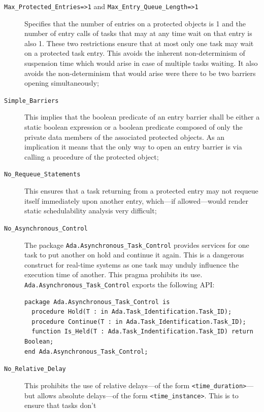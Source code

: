 \begin{description}
\item[\texttt{Max\_Protected\_Entries=>1} and
  \texttt{Max\_Entry\_Queue\_Length=>1}]{Specifies that the number of
  entries on a protected objects is 1 and the number of entry calls of
  tasks that may at any time wait on that entry is also 1. These two
  restrictions ensure that at most only one task may wait on a
  protected task entry. This avoids the inherent non-determinism of
  suspension time which would arise in case of multiple tasks
  waiting. It also avoids the non-determinism that would arise were
  there to be two barriers opening simultaneously;}
\item[\texttt{Simple\_Barriers}]{This implies that the boolean
  predicate of an entry barrier shall be either a static boolean
  expression or a boolean predicate composed of only the private data
  members of the associated protected objects. As an implication it
  means that the only way to open an entry barrier is via calling a
  procedure of the protected object;}
\item[\texttt{No\_Requeue\_Statements}]{This ensures that a task
  returning from a protected entry may not requeue itself immediately
  upon another entry, which---if allowed---would render static
  schedulability analysis very difficult;}
\item[\texttt{No\_Asynchronous\_Control}]{The package
  \texttt{Ada.Asynchronous\_Task\_Control} provides services for one
  task to put another on hold and continue it again. This is a
  dangerous construct for real-time systems as one task may unduly
  influence the execution time of another. This pragma prohibits its
  use. \texttt{Ada.Asynchronous\_Task\_Control} exports the following
  API:
\begin{lstlisting}[label=ada.asynchronous_task_control, caption=The
    \texttt{Ada.Asynchronous\_Task\_Control} package specification]
package Ada.Asynchronous_Task_Control is
  procedure Hold(T : in Ada.Task_Identification.Task_ID);
  procedure Continue(T : in Ada.Task_Identification.Task_ID);
  function Is_Held(T : Ada.Task_Indentification.Task_ID) return Boolean;
end Ada.Asynchronous_Task_Control;
\end{lstlisting}}
\item[\texttt{No\_Relative\_Delay}]{This prohibits the use of relative
  delays---of the form  \texttt{<time\_duration>}---but
  allows absolute delays---of the form 
  \texttt{<time\_instance>}. This is to ensure that tasks don't
}
\end{description}
